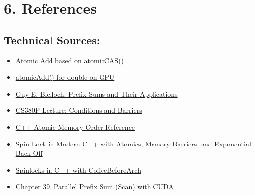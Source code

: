 \documentclass[letterpaper,12pt]{article}
\theoremstyle{remark}
\begin{document}
\section*{6. References}


\subsection*{Technical Sources:}

\begin{itemize}

    \item \href{https://docs.nvidia.com/cuda/cuda-c-programming-guide/index.html#atomic-functions}{Atomic Add based on atomicCAS()}
    \item \href{https://stackoverflow.com/questions/16077464/atomicadd-for-double-on-gpu}{atomicAdd() for double on GPU}
    \item \href{https://www.cs.cmu.edu/~guyb/papers/Ble93.pdf}{Guy E. Blelloch: Prefix Sums and Their Applications}
    \item \href{https://www.cs.utexas.edu/~rossbach/cs380p/lectures/06-Conditions+Barriers.pdf}{CS380P Lecture: Conditions and Barriers}
    \item \href{https://en.cppreference.com/w/cpp/atomic/memory_order}{C++ Atomic Memory Order Reference}
    \item \href{https://medium.com/@joao_vaz/spin-lock-in-modern-c-with-atomics-memory-barriers-and-exponential-back-off-522798aca817}{Spin-Lock in Modern C++ with Atomics, Memory Barriers, and Exponential Back-Off}
    \item \href{https://coffeebeforearch.github.io/2020/11/07/spinlocks-6.html}{Spinlocks in C++ with CoffeeBeforeArch}
    \item \href{https://developer.nvidia.com/gpugems/gpugems3/part-vi-gpu-computing/chapter-39-parallel-prefix-sum-scan-cuda}{Chapter 39. Parallel Prefix Sum (Scan) with CUDA}
   \end{itemize}
\end{document}
